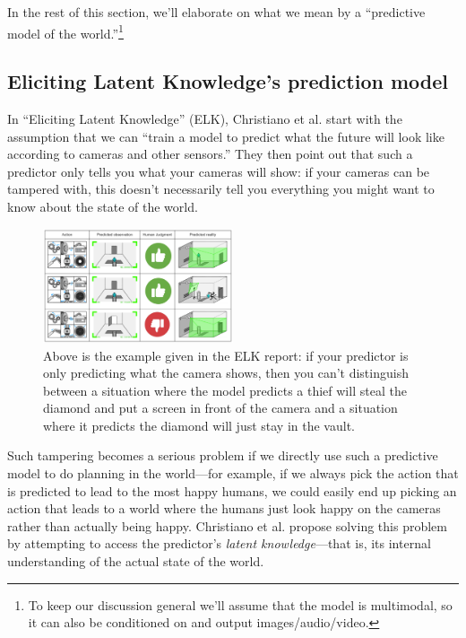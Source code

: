 \documentclass[
  twocolumn,
  natbib,
]{miri-tech-article}
\begin{document}
In the rest of this section, we'll elaborate on what we mean by a ``predictive model of the world.''\footnote{To keep our discussion general we'll assume that the model is multimodal, so it can also be conditioned on and output images/audio/video.}


\subsection{Eliciting Latent Knowledge's prediction model}\label{subsec:elk_prediction_model}

In ``Eliciting Latent Knowledge\cite{elk}'' (ELK), Christiano et al. start with the assumption that we can ``train a model to predict what the future will look like according to cameras and other sensors.'' They then point out that such a predictor only tells you what your cameras will show: if your cameras can be tampered with, this doesn't necessarily tell you everything you might want to know about the state of the world.

\begin{figure}[h!]
  \centering
  \includegraphics[width=0.5\textwidth]{V6aklBz.png}
  \caption{Above is the example given in the ELK report: if your predictor is only predicting what the camera shows, then you can't distinguish between a situation where the model predicts a thief will steal the diamond and put a screen in front of the camera and a situation where it predicts the diamond will just stay in the vault.}
\end{figure}

Such tampering becomes a serious problem if we directly use such a predictive model to do planning in the world---for example, if we always pick the action that is predicted to lead to the most happy humans, we could easily end up picking an action that leads to a world where the humans just look happy on the cameras rather than actually being happy. Christiano et al. propose solving this problem by attempting to access the predictor's \textit{latent knowledge}---that is, its internal understanding of the actual state of the world.
\end{document}
